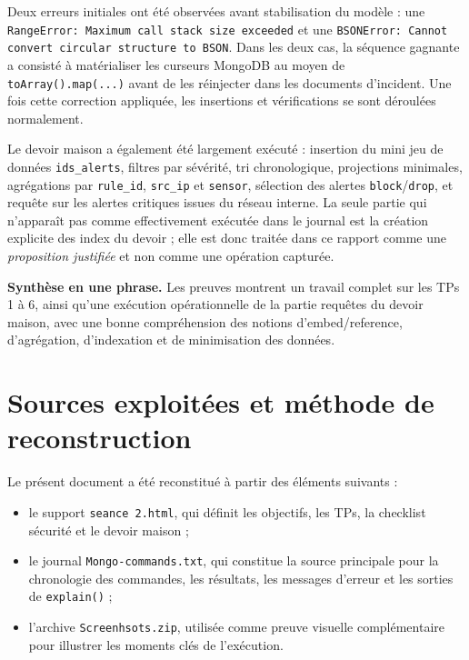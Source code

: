 \documentclass[11pt,a4paper]{article}
\begin{document}
Deux erreurs initiales ont été observées avant stabilisation du modèle : une \texttt{RangeError: Maximum call stack size exceeded} et une \texttt{BSONError: Cannot convert circular structure to BSON}. Dans les deux cas, la séquence gagnante a consisté à matérialiser les curseurs MongoDB au moyen de \texttt{toArray().map(...)} avant de les réinjecter dans les documents d'incident. Une fois cette correction appliquée, les insertions et vérifications se sont déroulées normalement.

Le devoir maison a également été largement exécuté : insertion du mini jeu de données \texttt{ids\_alerts}, filtres par sévérité, tri chronologique, projections minimales, agrégations par \texttt{rule\_id}, \texttt{src\_ip} et \texttt{sensor}, sélection des alertes \texttt{block}/\texttt{drop}, et requête sur les alertes critiques issues du réseau interne. La seule partie qui n'apparaît pas comme effectivement exécutée dans le journal est la création explicite des index du devoir ; elle est donc traitée dans ce rapport comme une \emph{proposition justifiée} et non comme une opération capturée.

\begin{warningbox}
\textbf{Synthèse en une phrase.}
Les preuves montrent un travail complet sur les TPs 1 à 6, ainsi qu'une exécution opérationnelle de la partie requêtes du devoir maison, avec une bonne compréhension des notions d'embed/reference, d'agrégation, d'indexation et de minimisation des données.
\end{warningbox}

\section{Sources exploitées et méthode de reconstruction}

Le présent document a été reconstitué à partir des éléments suivants :

\begin{itemize}[leftmargin=1.2cm]
\item le support \texttt{seance 2.html}, qui définit les objectifs, les TPs, la checklist sécurité et le devoir maison ;
\item le journal \texttt{Mongo-commands.txt}, qui constitue la source principale pour la chronologie des commandes, les résultats, les messages d'erreur et les sorties de \texttt{explain()} ;
\item l'archive \texttt{Screenhsots.zip}, utilisée comme preuve visuelle complémentaire pour illustrer les moments clés de l'exécution.
\end{itemize}
\end{document}
